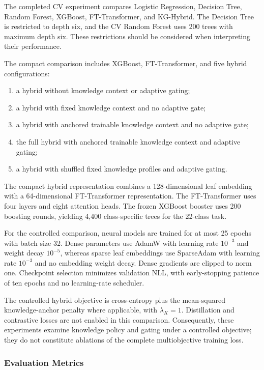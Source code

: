 The completed CV experiment compares Logistic Regression,
Decision Tree, Random Forest, XGBoost, FT-Transformer, and KG-Hybrid.
The Decision Tree is restricted to depth six, and the CV Random
Forest uses 200 trees with maximum depth six. These restrictions
should be considered when interpreting their performance.

The compact comparison includes XGBoost, FT-Transformer, and five
hybrid configurations:

\begin{enumerate}
    \item a hybrid without knowledge context or adaptive gating;
    \item a hybrid with fixed knowledge context and no adaptive gate;
    \item a hybrid with anchored trainable knowledge context and
          no adaptive gate;
    \item the full hybrid with anchored trainable knowledge context
          and adaptive gating;
    \item a hybrid with shuffled fixed knowledge profiles and
          adaptive gating.
\end{enumerate}

The compact hybrid representation combines a 128-dimensional
leaf embedding with a 64-dimensional FT-Transformer representation.
The FT-Transformer uses four layers and eight attention heads.
The frozen XGBoost booster uses 200 boosting rounds, yielding
4,400 class-specific trees for the 22-class task.

For the controlled comparison, neural models are trained for at most
25 epochs with batch size 32. Dense parameters use AdamW with learning
rate $10^{-3}$ and weight decay $10^{-5}$, whereas sparse leaf
embeddings use SparseAdam with learning rate $10^{-3}$ and no embedding
weight decay. Dense gradients are clipped to norm one.
Checkpoint selection minimizes validation NLL, with early-stopping
patience of ten epochs and no learning-rate scheduler.

The controlled hybrid objective is cross-entropy plus the
mean-squared knowledge-anchor penalty where applicable, with
$\lambda_K=1$. Distillation and contrastive losses are not enabled
in this comparison. Consequently, these experiments examine knowledge
policy and gating under a controlled objective; they do not constitute
ablations of the complete multiobjective training loss.

\subsubsection{Evaluation Metrics}

